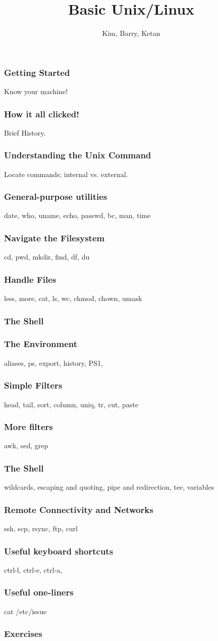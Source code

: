 \documentclass[hyperref={pdfpagelabels=false},12pt]{beamer}
\title[Basic Unix/Linux]{{Basic Unix/Linux}}
\author[Basic Unix/Linux]{{Kim, Barry, Ketan}}
\date{}
\begin{document}
\begin{frame}[plain]
\titlepage
\end{frame}

\begin{frame}
\frametitle{Getting Started}
Know your machine!
\end{frame}

\begin{frame}
\frametitle{How it all clicked!}
Brief History.
\end{frame}

\begin{frame}
\frametitle{Understanding the Unix Command}
Locate commands; internal vs. external.
\end{frame}

\begin{frame}
\frametitle{General-purpose utilities}
date, who, uname, echo, passwd, bc, man, time
\end{frame}

\begin{frame}
\frametitle{Navigate the Filesystem}
cd, pwd, mkdir, find, df, du
\end{frame}

\begin{frame}
\frametitle{Handle Files}
less, more, cat, ls, wc, chmod, chown, umask
\end{frame}

\begin{frame}
\frametitle{The Shell}
\end{frame}

\begin{frame}
\frametitle{The Environment}
aliases, ps, export, history, PS1, 
\end{frame}

\begin{frame}
\frametitle{Simple Filters}
head, tail, sort, column, uniq, tr, cut, paste 
\end{frame}

\begin{frame}
\frametitle{More filters}
awk, sed, grep
\end{frame}

\begin{frame}
\frametitle{The Shell}
wildcards, escaping and quoting, pipe and redirection, tee, variables
\end{frame}

\begin{frame}
\frametitle{Remote Connectivity and Networks}
ssh, scp, rsync, ftp, curl
\end{frame}

\begin{frame}
\frametitle{Useful keyboard shortcuts}
ctrl-l, ctrl-e, ctrl-a, 
\end{frame}

\begin{frame}
\frametitle{Useful one-liners}
cat /etc/issue
\end{frame}

\begin{frame}
\frametitle{Exercises}
\end{frame}
\end{document}
